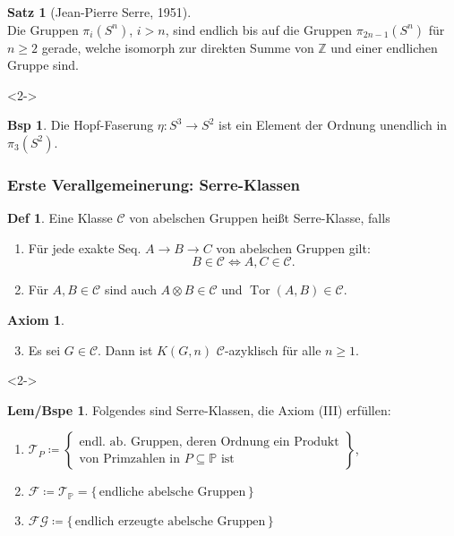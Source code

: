 \documentclass{beamer}
\newcommand{\Z}{\mathbb{Z}} %
\newcommand{\SC}{\mathcal{C}} %
\newcommand{\FG}{\mathcal{FG}} %
\newcommand{\T}{\mathcal{T}} %
\newcommand{\F}{\mathcal{F}} %
\DeclareMathOperator{\Tor}{Tor} %
\newcommand{\Primes}{\mathbb{P}} %
\theoremstyle{definition}
\newtheorem*{defn}{Def} %
\newtheorem*{satz}{Satz}
\newtheorem*{bsp}{Bsp} %
\newtheorem*{axiom}{Axiom}
\newtheorem*{lembspe}{Lem/Bspe} %
\renewcommand{\emph}[1]{\textcolor{Emph}{#1}}
\begin{document}
\begin{frame}
  \begin{satz}[Jean-Pierre Serre, 1951] \mbox{} \\
    Die Gruppen $\pi_i(S^n)$, $i > n$, sind endlich bis auf die Gruppen $\pi_{2n-1}(S^n)$ für $n \geq 2$ gerade, welche isomorph zur direkten Summe von $\Z$ und einer endlichen Gruppe sind.
  \end{satz}
  
  \begin{visibleenv}<2->
  \begin{bsp}
    Die Hopf-Faserung $\eta : S^3 \to S^2$ ist ein Element der Ordnung unendlich in $\pi_3(S^2)$.
  \end{bsp}
  \end{visibleenv}
\end{frame}

\begin{frame}
  \frametitle{Erste Verallgemeinerung: Serre-Klassen}
  \begin{defn}
    Eine Klasse $\SC$ von abelschen Gruppen heißt \emph{Serre-Klasse}, falls
    \begin{enumerate}[label=(\Roman*)]
      \item Für jede exakte Seq. $A \to B \to C$ von abelschen Gruppen gilt:
      \[
        B \in \SC \iff A, C \in \SC.
      \]
      \item Für $A, B \in \SC$ sind auch $A \otimes B \in \SC$ und $\Tor(A, B) \in \SC$.
    \end{enumerate}
  \end{defn}
  \begin{axiom} \mbox{} \\
    \begin{enumerate}[label=(\Roman*)]
      \setcounter{enumi}{2}
      \item Es sei $G \in \SC$.
      Dann ist $K(G, n)$ $\SC$-azyklisch für alle $n \geq 1$.
    \end{enumerate}
  \end{axiom}

  \begin{visibleenv}<2->
  \begin{lembspe}
    Folgendes sind Serre-Klassen, die Axiom (III) erfüllen:
    \begin{enumerate}[label=\alph*)]
      \item $\T_P \coloneqq \left\{ \begin{array}{l}
        \text{endl. ab. Gruppen, deren Ordnung ein Produkt} \\
        \text{von Primzahlen in $P \subseteq \Primes$ ist}
      \end{array} \right\}$,
      \item $\F \coloneqq \T_\Primes = \{\, \text{endliche abelsche Gruppen} \,\}$
      \item $\FG \coloneqq \{\, \text{endlich erzeugte abelsche Gruppen} \,\}$
    \end{enumerate}
  \end{lembspe}
  \end{visibleenv}
\end{frame}
\end{document}
